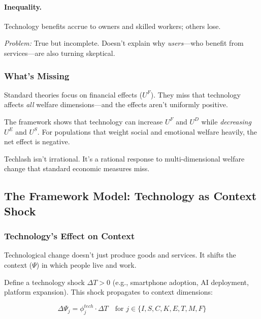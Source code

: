 \paragraph{Inequality.}
Technology benefits accrue to owners and skilled workers; others lose.

\textit{Problem:} True but incomplete. Doesn't explain why \emph{users}---who 
benefit from services---are also turning skeptical.

\subsubsection{What's Missing}

Standard theories focus on financial effects ($U^F$). They miss that technology 
affects \emph{all} welfare dimensions---and the effects aren't uniformly positive.

The framework shows that technology can increase $U^F$ and $U^D$ while 
\emph{decreasing} $U^E$ and $U^S$. For populations that weight social and 
emotional welfare heavily, the net effect is negative.

Techlash isn't irrational. It's a rational response to multi-dimensional 
welfare change that standard economic measures miss.

\subsection{The Framework Model: Technology as Context Shock}

\subsubsection{Technology's Effect on Context}

Technological change doesn't just produce goods and services. It shifts the 
context ($\Psi$) in which people live and work.

Define a technology shock $\Delta T > 0$ (e.g., smartphone adoption, AI deployment, 
platform expansion). This shock propagates to context dimensions:

\begin{equation}
\Delta \Psi_j = \phi_j^{tech} \cdot \Delta T \quad \text{for } j \in \{I, S, C, K, E, T, M, F\}
\label{eq:tech-context}
\end{equation}

